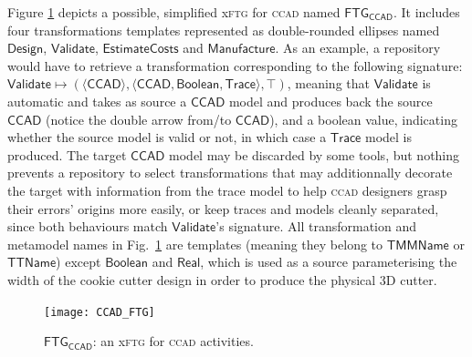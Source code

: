 Figure \ref{fig:CCAD-FTG} depicts a possible, simplified x\textsc{ftg} for 
\textsc{ccad} named $\mathsf{FTG_{CCAD}}$. It includes four transformations 
templates represented as double-rounded ellipses named $\mathsf{Design}$, 
$\mathsf{Validate}$, $\mathsf{EstimateCosts}$ and $\mathsf{Manufacture}$. As an 
example, a repository would have to retrieve a transformation corresponding to
the following signature: $\mathsf{Validate} \mapsto 
(\langle\mathsf{CCAD}\rangle, \langle \mathsf{CCAD}, \mathsf{Boolean}, 
\mathsf{Trace}\rangle, \top)$, meaning that $\mathsf{Validate}$ is automatic and 
takes as source a $\mathsf{CCAD}$ model and produces back the source 
$\mathsf{CCAD}$ (notice the double arrow from/to $\mathsf{CCAD}$), and a 
boolean value, indicating whether the source model is valid or not, in which 
case a $\mathsf{Trace}$ model is produced. The target $\mathsf{CCAD}$ model may 
be discarded by some tools, but nothing prevents a repository to select 
transformations that may additionnally decorate the target with information 
from the trace model to help \textsc{ccad} designers grasp their errors' 
origins more easily, or keep traces and models cleanly separated, since both 
behaviours match $\mathsf{Validate}$'s signature. All transformation and 
metamodel names in Fig.~\ref{fig:CCAD-FTG} are templates (meaning they belong 
to $\mathsf{TMMName}$ or $\mathsf{TTName}$) except $\mathsf{Boolean}$ and 
$\mathsf{Real}$, which is used as a source parameterising the width of the 
cookie cutter design in order to produce the physical 3D cutter.

\begin{figure}[t]
   \centering
   \texttt{[image: CCAD\_FTG]}
   \caption{$\mathsf{FTG_{CCAD}}$: an x\textsc{ftg} for \textsc{ccad} 
activities.}%
   \label{fig:CCAD-FTG}%
\end{figure}

